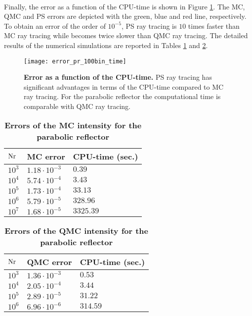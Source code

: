 \\ \indent
Finally, the error as a function of the CPU-time is shown in Figure \ref{fig:error_time_pr}. The MC, QMC and PS errors are depicted with the green, blue and red line, respectively. To obtain an error of the order of $10^{-5}$, PS ray tracing is $10$ times faster than MC ray tracing while becomes twice slower than QMC ray tracing. The detailed results of the numerical simulations are reported in Tables \ref{tab:mc_error_pr_triangulation} and \ref{tab:QMC_error_pr_triangulation}.
\begin{figure}[h!]
  \center
  \texttt{[image: error\_pr\_100bin\_time]}
  \caption{\textbf{Error as a function of the CPU-time.} PS ray tracing has significant advantages in terms of the CPU-time compared to MC ray tracing. For the parabolic reflector the computational time is comparable with QMC ray tracing.}
  \label{fig:error_time_pr}
\end{figure} 
\begin{table}[ht] 
\centering
\caption{\bf Errors of the MC intensity for the parabolic reflector}
\begin{tabular}{lll}
 \hline   $\textrm{Nr}$ & MC error & CPU-time (sec.) \\
  \hline 
 $10^3$     & $1.18\cdot10^{-3}$ & $0.39$\\
 $10^4$     & $5.74\cdot 10^{-4}$ & $3.43$ \\
 $10^5$     & $1.73\cdot 10^{-4}$ & $33.13$\\
 $10^6$     & $5.79\cdot 10^{-5}$ & $328.96$\\
 $10^7$     & $1.68\cdot 10^{-5}$ & $3325.39$\\
 \hline
 \end{tabular}
 \label{tab:mc_error_pr_triangulation}
 \end{table}
\begin{table}[ht] 
\centering
\caption{\bf Errors of the QMC intensity for the parabolic reflector}
\begin{tabular}{lll}
 \hline   $\textrm{Nr}$ & QMC error & CPU-time (sec.) \\
  \hline 
 $10^3$     & $1.36\cdot10^{-3}$ & $0.53$\\
 $10^4$     & $2.05\cdot 10^{-4}$ & $3.44$ \\
 $10^5$     & $2.89\cdot 10^{-5}$ & $31.22$\\
 $10^6$     & $6.96\cdot 10^{-6}$ & $314.59$\\
 \hline
 \end{tabular}
 \label{tab:QMC_error_pr_triangulation}
 \end{table}
